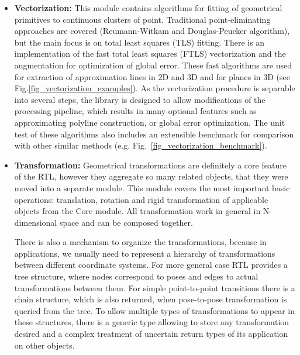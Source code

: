 \documentclass[
    letterpaper, 
    10 pt, 
    conference,
    table,
]{ieeeconf}
\begin{document}
\begin{itemize}
    \begin{figure*}[t]
        \centering
        \texttt{[image: figures/hc\_sig0\_003.pdf]}
        \caption{Speed benchmark of vectorization algorithms - semicircular point cloud \cite{Jelinek2017dt}. (FTLS~\cite{Jelinek2016} - green, INC~\cite{Nguyen2007} - dark green, DP~\cite{Douglas1973} - black, RW~\cite{Reumann1974} - gray)}
        \label{fig_vectorization_benchmark}
    \end{figure*}
    
    \item \textbf{Vectorization:} This module contains algorithms for fitting of geometrical primitives to continuous clusters of point. Traditional point-eliminating approaches are covered (Reumann-Witkam \cite{Reumann1974} and Douglas-Peucker \cite{Douglas1973} algorithm), but the main focus is on total least squares (TLS) fitting. There is an implementation of the fast total least squares (FTLS) vectorization \cite{Jelinek2016} and the augmentation  \cite{Jelinek2016a} for optimization of global error. These fast algorithms are used for extraction of approximation lines in 2D and 3D and for planes in 3D (see Fig.\ref{fig_vectorization_examples}). As the vectorization procedure is separable into several steps, the library is designed to allow modifications of the processing pipeline, which results in many optional features such as approximating polyline construction, or global error optimization. The unit test of these algorithms also includes an extensible benchmark for comparison with other similar methods (e.g. Fig.~\ref{fig_vectorization_benchmark}).

    \item \textbf{Transformation:} Geometrical transformations are definitely a core feature of the RTL, however they aggregate so many related objects, that they were moved into a separate module. This module covers the most important basic operations: translation, rotation and rigid transformation of applicable objects from the Core module. All transformation work in general in N-dimensional space and can be composed together.
    
    There is also a mechanism to organize the transformations, because in applications, we usually need to represent a hierarchy of transformations between different coordinate systems. For more general case RTL provides a tree structure, where nodes correspond to poses and edges to actual transformations between them. For simple point-to-point transitions there is a chain structure, which is also returned, when pose-to-pose transformation is queried from the tree. To allow multiple types of transformations to appear in these structures, there is a generic type allowing to store any transformation desired and a complex treatment of uncertain return types of its application on other objects.


\end{itemize}
\end{document}
